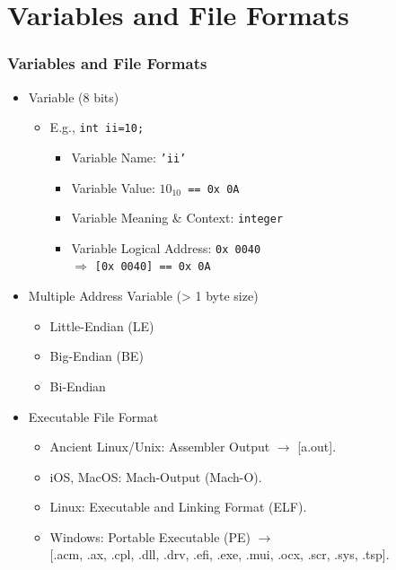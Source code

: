 \documentclass[aspectratio=169, xcolor=table, notheorems, hyperref={pdfpagelabels=false}]{beamer}
\begin{document}
\section{Variables and File Formats}
\begin{frame}
\frametitle{Variables and File Formats}
\begin{itemize}
\item Variable (8 bits)
\begin{itemize}
\item E.g., \texttt{int ii=10;}
\begin{itemize}
\item Variable Name: \texttt{'ii'}
\item Variable Value:  \texttt{$10_{10}$ == 0x 0A}
\item Variable Meaning \& Context:  \texttt{integer}
\item Variable Logical Address: \texttt{0x 0040} \\
 $\Longrightarrow$ \texttt{[0x 0040] == 0x 0A}
\end{itemize}
\end{itemize}
\item Multiple Address Variable (> 1 byte size)
\begin{itemize}
\item Little-Endian (LE)
\item Big-Endian (BE)
\item Bi-Endian
\end{itemize}
\item Executable File Format
\begin{itemize}
\item Ancient Linux/Unix: Assembler Output $\rightarrow$ [a.out].
\item iOS, MacOS: Mach-Output (Mach-O).
\item Linux: Executable and Linking Format (ELF).
\item Windows: Portable Executable (PE) $\rightarrow$ \\[0mm]
      [.acm, .ax, .cpl, .dll, .drv, .efi, .exe, .mui, .ocx, .scr, .sys, .tsp].
\end{itemize}
\end{itemize}
\end{frame}

\end{document}
